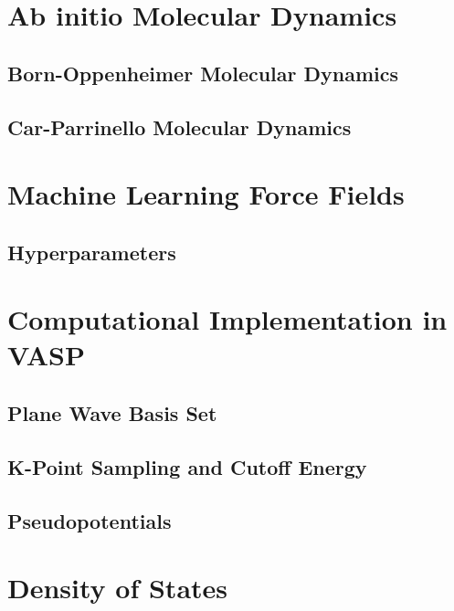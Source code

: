 \section{Ab initio Molecular Dynamics}

\subsection{Born-Oppenheimer Molecular Dynamics}

\subsection{Car-Parrinello Molecular Dynamics}

\section{Machine Learning Force Fields}
\subsection{Hyperparameters}

\section{Computational Implementation in VASP}
\subsection{Plane Wave Basis Set}
\subsection{K-Point Sampling and Cutoff Energy}
\subsection{Pseudopotentials}
\section{Density of States}



